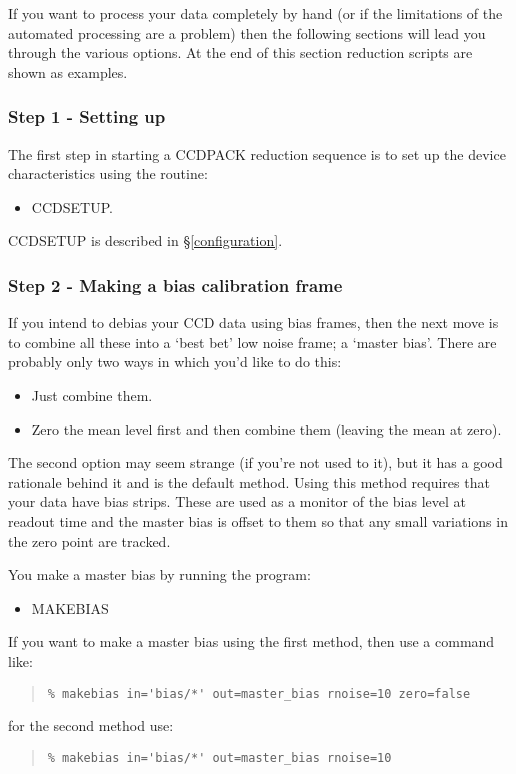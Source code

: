 \documentclass[twoside,11pt]{article}
\newcommand{\hyperref}[4]{#2\ref{#4}#3}
\newcommand{\htmlref}[2]{#1}
\newcommand{\latexhtml}[2]{#1}
\newcommand{\xlabel}[1]{}
\renewcommand{\_}{\texttt{\symbol{95}}}
\newcommand{\ttsize}{\latexhtml{\small}{}}
\newenvironment{myquote}{\begin{quote}\ttsize}{\end{quote}}
\newcommand{\routine}[1]{{\sc #1}}
\newcommand{\xroutine}[1]{\htmlref{{\sc #1}}{#1}}
\begin{document}
If you want to process your data completely by hand (or if the
limitations of the automated processing are a problem) then the
following sections will lead you through the various options. At the
end of this section reduction scripts are shown as examples.

\subsubsection{Step 1 - Setting up}
The first step in starting a CCDPACK reduction sequence is to set up
the device characteristics using the routine:
\begin{itemize}
\item \xroutine{CCDSETUP}.
\end{itemize}
\routine{CCDSETUP} is described \hyperref{elsewhere}{in \S}{}{configuration}.

\subsubsection{Step 2 - Making a bias calibration frame \xlabel{masterbias}
               \label{masterbias}}
If you intend to debias your CCD data using bias frames, then the next
move is to combine all these into a `best bet' low noise frame; a
`master bias'. There are probably only two ways in which you'd like to
do this:
\begin{itemize}
\item Just combine them.
\item Zero the mean level first and then combine them (leaving the
mean at zero).
\end{itemize}

The second option may seem strange (if you're not used to it), but it
has a good rationale behind it and is the default method. Using this
method requires that your data have bias strips.
These are used as a monitor of the bias level at readout time and the
master bias is offset to them so that any small variations in the zero
point are tracked.

You make a master bias by running the program:
\begin{itemize}
\item \xroutine{MAKEBIAS}
\end{itemize}
If you want to make a master bias using the first method, then use a
command like:
\begin{myquote}
\begin{verbatim}
% makebias in='bias/*' out=master_bias rnoise=10 zero=false
\end{verbatim}
\end{myquote}
for the second method use:
\begin{myquote}
\begin{verbatim}
% makebias in='bias/*' out=master_bias rnoise=10
\end{verbatim}
\end{myquote}
\end{document}
